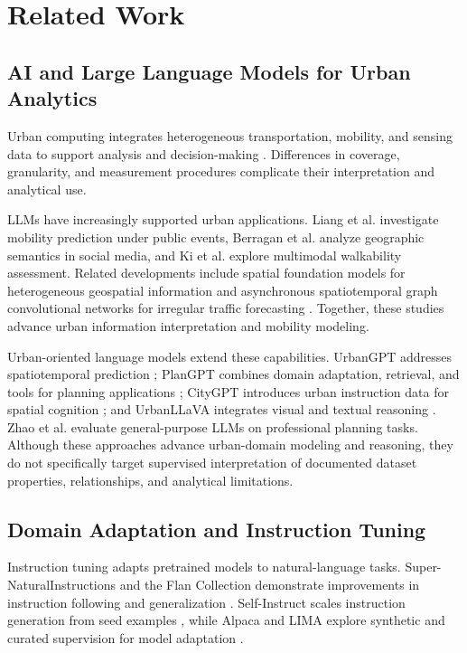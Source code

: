 \documentclass[a4paper,fleqn]{cas-sc}
\begin{document}
\section{Related Work}
\label{sec:related-work}

\subsection{AI and Large Language Models for Urban Analytics}

Urban computing integrates heterogeneous transportation, mobility, and sensing data to support analysis and decision-making \cite{zheng2014urban}. Differences in coverage, granularity, and measurement procedures complicate their interpretation and analytical use.

LLMs have increasingly supported urban applications. Liang et al. \cite{liang2024mobility} investigate mobility prediction under public events, Berragan et al. \cite{berragan2024semantic} analyze geographic semantics in social media, and Ki et al. \cite{ki2025walkability} explore multimodal walkability assessment. Related developments include spatial foundation models for heterogeneous geospatial information \cite{wang2024spatial} and asynchronous spatiotemporal graph convolutional networks for irregular traffic forecasting \cite{zhang2024irregular}. Together, these studies advance urban information interpretation and mobility modeling.

Urban-oriented language models extend these capabilities. UrbanGPT addresses spatiotemporal prediction \cite{li2024urbangpt}; PlanGPT combines domain adaptation, retrieval, and tools for planning applications \cite{zhu2024plangpt}; CityGPT introduces urban instruction data for spatial cognition \cite{feng2025citygpt}; and UrbanLLaVA integrates visual and textual reasoning \cite{feng2025urbanllava}. Zhao et al. \cite{zhao2025urban} evaluate general-purpose LLMs on professional planning tasks. Although these approaches advance urban-domain modeling and reasoning, they do not specifically target supervised interpretation of documented dataset properties, relationships, and analytical limitations.

\subsection{Domain Adaptation and Instruction Tuning}

Instruction tuning adapts pretrained models to natural-language tasks. Super-NaturalInstructions and the Flan Collection demonstrate improvements in instruction following and generalization \cite{longpre2023flan,wang2022supernaturalinstructions}. Self-Instruct scales instruction generation from seed examples \cite{wang2023selfinstruct}, while Alpaca and LIMA explore synthetic and curated supervision for model adaptation \cite{zhou2023lima,taori2023alpaca}.
\end{document}
